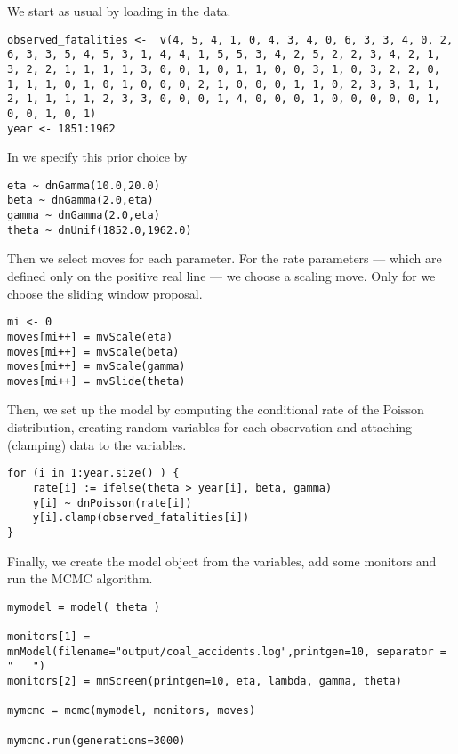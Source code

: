 We start as usual by loading in the data.
{\tt \begin{snugshade*}
\begin{lstlisting} 
observed_fatalities <-  v(4, 5, 4, 1, 0, 4, 3, 4, 0, 6, 3, 3, 4, 0, 2, 6, 3, 3, 5, 4, 5, 3, 1, 4, 4, 1, 5, 5, 3, 4, 2, 5, 2, 2, 3, 4, 2, 1, 3, 2, 2, 1, 1, 1, 1, 3, 0, 0, 1, 0, 1, 1, 0, 0, 3, 1, 0, 3, 2, 2, 0, 1, 1, 1, 0, 1, 0, 1, 0, 0, 0, 2, 1, 0, 0, 0, 1, 1, 0, 2, 3, 3, 1, 1, 2, 1, 1, 1, 1, 2, 3, 3, 0, 0, 0, 1, 4, 0, 0, 0, 1, 0, 0, 0, 0, 0, 1, 0, 0, 1, 0, 1)
year <- 1851:1962
\end{lstlisting}
\end{snugshade*}}
In \Rev we specify this prior choice by
{\tt \begin{snugshade*}
\begin{lstlisting} 
eta ~ dnGamma(10.0,20.0)
beta ~ dnGamma(2.0,eta)
gamma ~ dnGamma(2.0,eta)
theta ~ dnUnif(1852.0,1962.0)
\end{lstlisting}
\end{snugshade*}}
Then we select moves for each parameter.
For the rate parameters --- which are defined only on the positive real line --- we choose a scaling move.
Only for  we choose the sliding window proposal.
{\tt \begin{snugshade*}
\begin{lstlisting} 
mi <- 0
moves[mi++] = mvScale(eta)
moves[mi++] = mvScale(beta)
moves[mi++] = mvScale(gamma)
moves[mi++] = mvSlide(theta)
\end{lstlisting}
\end{snugshade*}}
Then, we set up the model by computing the conditional rate of the Poisson distribution, creating random variables for each observation and attaching (clamping) data to the variables.
{\tt \begin{snugshade*}
\begin{lstlisting} 
for (i in 1:year.size() ) {
    rate[i] := ifelse(theta > year[i], beta, gamma)
    y[i] ~ dnPoisson(rate[i])
    y[i].clamp(observed_fatalities[i])
}
\end{lstlisting}
\end{snugshade*}}
Finally, we create the model object from the variables, add some monitors and run the MCMC algorithm.
{\tt \begin{snugshade*}
\begin{lstlisting} 
mymodel = model( theta )

monitors[1] = mnModel(filename="output/coal_accidents.log",printgen=10, separator = "	")
monitors[2] = mnScreen(printgen=10, eta, lambda, gamma, theta)

mymcmc = mcmc(mymodel, monitors, moves)

mymcmc.run(generations=3000)
\end{lstlisting}
\end{snugshade*}}




